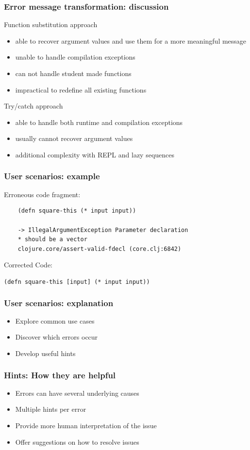 \documentclass{beamer}
\begin{document}
\begin{frame}
\frametitle{Error message transformation: discussion}
	 Function substitution approach
	 \begin{itemize}
	 \item able to recover argument values and use them for a more meaningful message
	 \item unable to handle compilation exceptions
	 \item can not handle student made functions
	 \item impractical to redefine all existing functions
	 \end{itemize}
	 Try/catch approach
	 \begin{itemize}
	 \item able to handle both runtime and compilation exceptions
	 \item usually cannot recover argument values
	 \item additional complexity with REPL and lazy sequences
	 \end{itemize}
\end{frame}

\begin{frame}[fragile]
\frametitle{User scenarios: example}
	Erroneous code fragment:
	\begin{verbatim}
	(defn square-this (* input input))
	
	-> IllegalArgumentException Parameter declaration
	* should be a vector 
	clojure.core/assert-valid-fdecl (core.clj:6842)
	\end{verbatim}
	
	Corrected Code:
	
	\texttt{(defn square-this \alert{[input]} (* input input))}
\end{frame}

\begin{frame}
\frametitle{User scenarios: explanation}
	\begin{itemize}
  	 \item Explore common use cases
  	 \item Discover which errors occur
  	 \item Develop useful hints
	 \end{itemize}
\end{frame}

\begin{frame}
\frametitle{Hints: How they are helpful}
	\begin{itemize}
  	 \item Errors can have several underlying causes
  	 \item Multiple hints per error
  	 \item Provide more human interpretation of the issue
  	 \item Offer suggestions on how to resolve issues
	 \end{itemize}
\end{frame}
\end{document}
